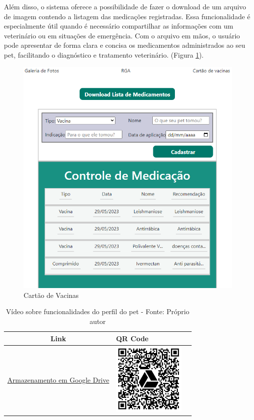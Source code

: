 Além disso, o sistema oferece a possibilidade de fazer o download de um arquivo de imagem contendo a listagem das medicações registradas. Essa funcionalidade é especialmente útil quando é necessário compartilhar as informações com um veterinário ou em situações de emergência. Com o arquivo em mãos, o usuário pode apresentar de forma clara e concisa os medicamentos administrados ao seu pet, facilitando o diagnóstico e tratamento veterinário. (Figura \ref{fig:CartaoDeVacinas}).
\begin{figure}[htb]
     \centering
     \includegraphics[width=12cm]{arquivos/Figuras/cartaovacinas.png}
     \caption{Cartão de Vacinas}
         \label{fig:CartaoDeVacinas}
\end{figure}

\begin{table}[htbp]
\centering
\renewcommand{\arraystretch}{1.5}
\begin{tabular}{|c|>{\centering\arraybackslash}m{6cm}|c|}
\hline
\textbf{Link} & \textbf{QR Code} \\
\hline
\href{https://drive.google.com/file/d/1vI_Te1o12bq-3kZFpDAnJCw6DOH5CZHc/view?usp=drive_link}{Armazenamento em Google Drive} & \includegraphics[width=3.5cm]{arquivos/ImgLinks/funcionalidadesPet.png} \\
\hline
\end{tabular}
\caption*{Vídeo sobre funcionalidades do perfil do pet - Fonte: Próprio autor}
\end{table}

